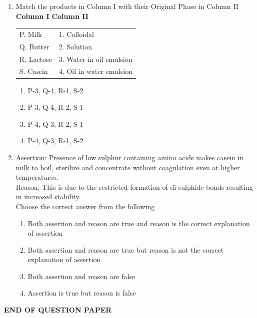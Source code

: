 \documentclass[journal,12pt,onecolumn]{IEEEtran}
\begin{document}
\begin{enumerate}[label=\arabic*.,resume]
\item Match the products in Column I with their Original Phase in Column II \\

\textbf{Column I} \hspace{4cm} \textbf{Column II} \\[6pt]

\begin{tabular}{p{6cm} p{8cm}}
P. Milk    & 1. Colloidal \\
Q. Butter  & 2. Solution \\
R. Lactose & 3. Water in oil emulsion \\
S. Casein  & 4. Oil in water emulsion \\
\end{tabular}

\begin{multicols}{2}
\begin{enumerate}[label=(\Alph*)]
\item P-3, Q-4, R-1, S-2
\item P-3, Q-4, R-2, S-1
\item P-4, Q-3, R-2, S-1
\item P-4, Q-3, R-1, S-2
\end{enumerate}
\end{multicols}

\item Assertion: Presence of low sulphur containing amino acids makes casein in milk to boil, sterilize and concentrate without coagulation even at higher temperatures. \\
Reason: This is due to the restricted formation of di-sulphide bonds resulting in increased stability. \\
Choose the correct answer from the following

\begin{enumerate}[label=(\Alph*)]
\item Both assertion and reason are true and reason is the correct explanation of assertion
\item Both assertion and reason are true but reason is not the correct explanation of assertion
\item Both assertion and reason are false
\item Assertion is true but reason is false
\end{enumerate}
\end{enumerate}

\begin{center}
\textbf{END OF QUESTION PAPER}
\end{center}
\end{document}
